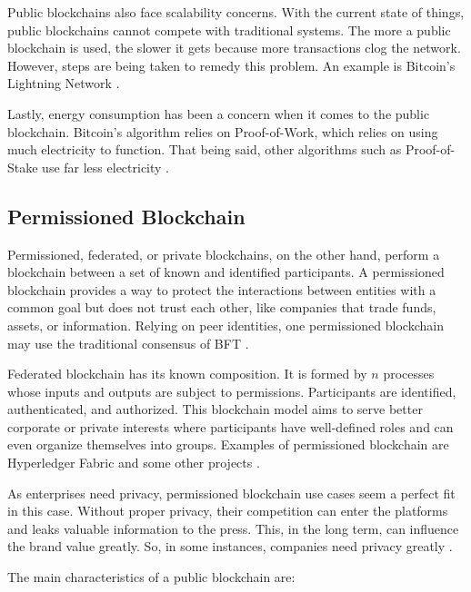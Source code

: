 Public blockchains also face scalability concerns. With the current state of things, public blockchains cannot compete with traditional systems. The more a public blockchain is used, the slower it gets because more transactions clog the network. However, steps are being taken to remedy this problem. An example is Bitcoin’s Lightning Network \cite{selfkeyOrg}.

Lastly, energy consumption has been a concern when it comes to the public blockchain. Bitcoin’s algorithm relies on Proof-of-Work, which relies on using much electricity to function. That being said, other algorithms such as Proof-of-Stake use far less electricity \cite{selfkeyOrg}. 


\subsection{Permissioned Blockchain}\label{sec:blockchainPrivada}
Permissioned, federated, or private blockchains, on the other hand, perform a blockchain between a set of known and identified participants. A permissioned blockchain provides a way to protect the interactions between entities with a common goal but does not trust each other, like companies that trade funds, assets, or information. Relying on peer identities, one permissioned blockchain may use the traditional consensus of \acf{BFT} \cite{androulaki2018hyperledger}.

Federated blockchain has its known composition. It is formed by $n$ processes whose inputs and outputs are subject to permissions. Participants are identified, authenticated, and authorized. This blockchain model aims to serve better corporate or private interests where participants have well-defined roles and can even organize themselves into groups. Examples of permissioned blockchain are Hyperledger Fabric \cite{cachin2016architecture} and some other projects \cite{cachin2017blockchain}.

As enterprises need privacy, permissioned blockchain use cases seem a perfect fit in this case. Without proper privacy, their competition can enter the platforms and leaks valuable information to the press. This, in the long term, can influence the brand value greatly. So, in some instances, companies need privacy greatly \cite{101blockchains}.

The main characteristics of a public blockchain are:

